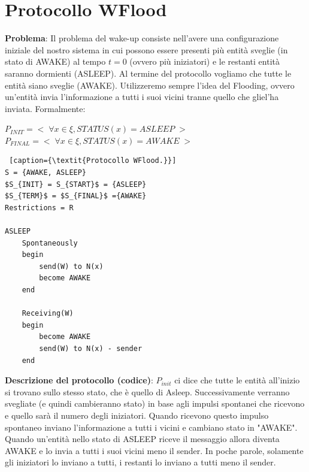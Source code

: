 \section{Protocollo WFlood}
\textbf{Problema}: Il problema del wake-up consiste nell'avere una configurazione iniziale del nostro sistema in cui possono essere presenti più entità sveglie (in stato di AWAKE) al tempo $t=0$ (ovvero più iniziatori) e le restanti entità saranno dormienti (ASLEEP). Al termine del protocollo vogliamo che tutte le entità siano sveglie (AWAKE). Utilizzeremo sempre l'idea del Flooding, ovvero un'entità invia l'informazione a tutti i suoi vicini tranne quello che gliel'ha inviata. Formalmente:

$P_{INIT} =<\; \forall x \in \xi, STATUS(x) = ASLEEP \;>$\\
$P_{FINAL} =<\; \forall x \in \xi, STATUS(x) = AWAKE \;>$\\

\begin{lstlisting} [caption={\textit{Protocollo WFlood.}}]
S = {AWAKE, ASLEEP}
$S_{INIT} = S_{START}$ = {ASLEEP}
$S_{TERM}$ = $S_{FINAL}$ ={AWAKE}
Restrictions = R

ASLEEP
    Spontaneously
    begin
        send(W) to N(x)
        become AWAKE
    end
    
    Receiving(W)
    begin
        become AWAKE
        send(W) to N(x) - sender
    end
\end{lstlisting}

\textbf{Descrizione del protocollo (codice)}: $P_{init}$ ci dice che tutte le entità all'inizio si trovano sullo stesso stato, che è quello di Asleep. Successivamente verranno svegliate (e quindi cambieranno stato) in base agli impulsi spontanei che ricevono e quello sarà il numero degli iniziatori. Quando ricevono questo impulso spontaneo inviano l'informazione a tutti i vicini e cambiano stato in "AWAKE". Quando un'entità nello stato di ASLEEP riceve il messaggio allora diventa AWAKE e lo invia a tutti i suoi vicini meno il sender. In poche parole, solamente gli iniziatori lo inviano a tutti, i restanti lo inviano a tutti meno il sender.

